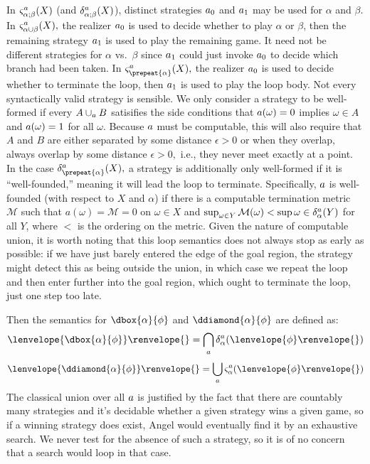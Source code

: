 \documentclass[12pt]{cmuthesis}
\theoremstyle{definition}
\theoremstyle{remark}
\newcommand{\om}{\omega}
\newcommand{\fint}[1]{\lenvelope{#1}\renvelope}
\begin{document}
In $\strategyforR[\alpha;\beta]{\aa}{X}$ (and $\dstrategyforR[\alpha;\beta]{\aa}{X}$), distinct strategies $\rzFst{\aa}$ and $\rzSnd{\aa}$ may be used for $\alpha$ and $\beta$.
In $\strategyforR[\alpha\cup\beta]{\aa}{X},$ the realizer $\rzFst{\aa}$ is used to decide whether to play $\alpha$ or $\beta$, then the remaining strategy $\rzSnd{\aa}$ is used to play the remaining game.
It need not be different strategies for $\alpha$ vs.\ $\beta$ since $\rzSnd{\aa}$ could just invoke $\rzFst{\aa}$ to decide which branch had been taken.
In $\strategyforR[\prepeat{\alpha}]{\aa}{X},$ the realizer $\rzFst{\aa}$ is used to decide whether to terminate the loop, then $\rzSnd{\aa}$ is used to play the loop body.
Not every syntactically valid strategy is sensible.
We only consider a strategy to be well-formed if every $A \cup_\aa B$ satisifies the side conditions that $\aa(\om)=0$ implies $\om \in A$ and $\aa(\om)=1$ for all $\om$. 
Because $\aa$ must be computable, this will also require that $A$ and $B$ are either separated by some distance $\epsilon > 0$ or when they overlap, always overlap by some distance $\epsilon > 0,$ i.e., they never meet exactly at a point.
In the case $\dstrategyforR[\prepeat{\alpha}]{\aa}{X},$ a strategy is additionally only well-formed if it is ``well-founded,'' meaning it will lead the loop to terminate.
Specifically, $\aa$ is well-founded (with respect to $X$ and $\alpha$) if there is a computable termination metric $\mathcal{M}$ such that $a(\om) = \mathcal{M}=0$ on $\om \in X$ and $\sup_{\om \in Y}\mathcal{M}(\om) < \sup{\om \in \dstrategyforR[\alpha]{\aa}{Y}}$ for all $Y$, where $<$ is the ordering on the metric.
Given the nature of computable union, it is worth noting that this loop semantics does not always stop as early as possible: if we have just barely entered the edge of the goal region, the strategy might detect this as being outside the union, in which case we repeat the loop and then enter further into the goal region, which ought to terminate the loop, just one step too late.

Then the semantics for $\dbox{\alpha}{\phi}$ and $\ddiamond{\alpha}{\phi}$ are defined as:
\[\fint{\dbox{\alpha}{\phi}}{} = \bigcap_\aa \dstrategyforR[\alpha]{\aa}{\fint{\phi}{}}\]
\[\fint{\ddiamond{\alpha}{\phi}}{} = \bigcup_\aa \strategyforR[\alpha]{\aa}{\fint{\phi}{}}\]
The classical union over all $\aa$ is justified by the fact that there are countably many strategies and it's decidable whether a given strategy wins a given game, so if a winning strategy does exist, Angel would eventually find it by an exhaustive search. We never test for the absence of such a strategy, so it is of no concern that a search would loop in that case.
\end{document}
